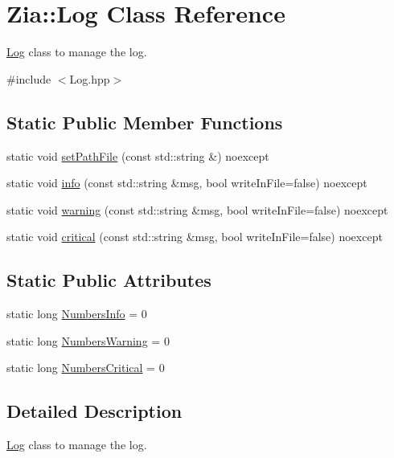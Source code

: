 \hypertarget{class_zia_1_1_log}{}\section{Zia\+:\+:Log Class Reference}
\label{class_zia_1_1_log}


\hyperlink{class_zia_1_1_log}{Log} class to manage the log.  




{\ttfamily \#include $<$Log.\+hpp$>$}

\subsection*{Static Public Member Functions}
\begin{DoxyCompactItemize}
\item 
static void \hyperlink{class_zia_1_1_log_ae26eb7733ba9cda16a36d2ad25c93bd4}{set\+Path\+File} (const std\+::string \&) noexcept
\item 
static void \hyperlink{class_zia_1_1_log_a7abad30f76aea6c210ae245885f05137}{info} (const std\+::string \&msg, bool write\+In\+File=false) noexcept
\item 
static void \hyperlink{class_zia_1_1_log_a4522d6218b4fb537c4291c36c171a855}{warning} (const std\+::string \&msg, bool write\+In\+File=false) noexcept
\item 
static void \hyperlink{class_zia_1_1_log_a5a7899f592f85e1da39e90ba32eef98b}{critical} (const std\+::string \&msg, bool write\+In\+File=false) noexcept
\end{DoxyCompactItemize}
\subsection*{Static Public Attributes}
\begin{DoxyCompactItemize}
\item 
static long \hyperlink{class_zia_1_1_log_a3080034dce1aca8c3cc7b85775d30a1b}{Numbers\+Info} = 0
\item 
static long \hyperlink{class_zia_1_1_log_a64ce5169f6328628c8074a7664f8445c}{Numbers\+Warning} = 0
\item 
static long \hyperlink{class_zia_1_1_log_ada4fab060168cbb9504c7ffa4b762868}{Numbers\+Critical} = 0
\end{DoxyCompactItemize}


\subsection{Detailed Description}
\hyperlink{class_zia_1_1_log}{Log} class to manage the log. 

